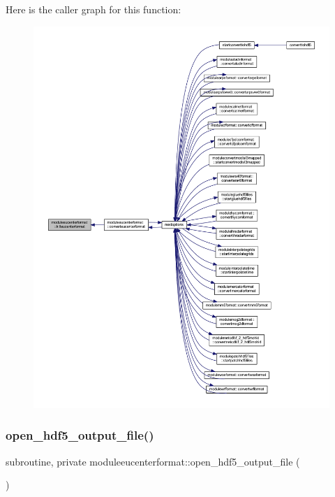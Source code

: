 Here is the caller graph for this function\+:\nopagebreak
\begin{figure}[H]
\begin{center}
\leavevmode
\includegraphics[width=350pt]{namespacemoduleeucenterformat_a86566f77f24a79f436c69106f22fe5f7_icgraph}
\end{center}
\end{figure}
\mbox{\label{namespacemoduleeucenterformat_a8e53ba660eb9e964abe2de913b95c20f}} 
\subsubsection{\texorpdfstring{open\+\_\+hdf5\+\_\+output\+\_\+file()}{open\_hdf5\_output\_file()}}
{\footnotesize\ttfamily subroutine, private moduleeucenterformat\+::open\+\_\+hdf5\+\_\+output\+\_\+file (\begin{DoxyParamCaption}{ }\end{DoxyParamCaption})\hspace{0.3cm}{\ttfamily [private]}}

